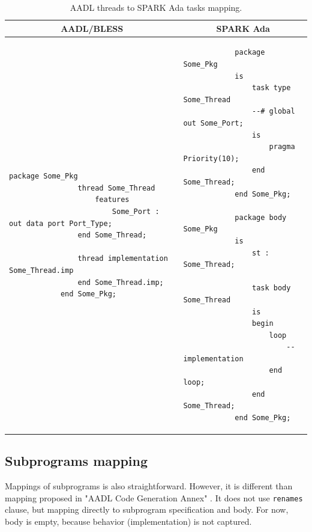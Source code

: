 \singlespacing
\begin{table}[!ht]
	\caption{AADL threads to SPARK Ada tasks mapping.}
	\label{table:threads2tasks}
	\centering
  	\begin{tabular}{ | p{3.5in} | p{2.5in} |}

		\hline
		\multicolumn{1}{|c|}{\textbf{AADL/BLESS}} & \multicolumn{1}{|c|}{\textbf{SPARK Ada}} \\ \hline

		\begin{lstlisting}[language=aadl]
			package Some_Pkg
				thread Some_Thread
					features
						Some_Port : out data port Port_Type;
				end Some_Thread;

				thread implementation Some_Thread.imp
				end Some_Thread.imp;
			end Some_Pkg;
		\end{lstlisting} 
		& 
		\begin{lstlisting}
			package Some_Pkg
			is
				task type Some_Thread
				--# global out Some_Port;
				is
					pragma Priority(10);
				end Some_Thread;
			end Some_Pkg;

			package body Some_Pkg
			is
				st : Some_Thread;

				task body Some_Thread
				is
				begin
					loop
						-- implementation
					end loop;
				end Some_Thread;
			end Some_Pkg;
		\end{lstlisting} 

		\\ \hline
	\end{tabular}
\end{table}
\doublespacing


\subsection{Subprograms mapping}
\label{codegen:mapping:subprograms}

Mappings of subprograms is also straightforward. However, it is different than mapping proposed in "AADL Code Generation Annex" \cite{AnnexDoc}. It does not use \lstinline{renames} clause, but mapping directly to subprogram specification and body. For now, body is empty, because behavior (implementation) is not captured.

